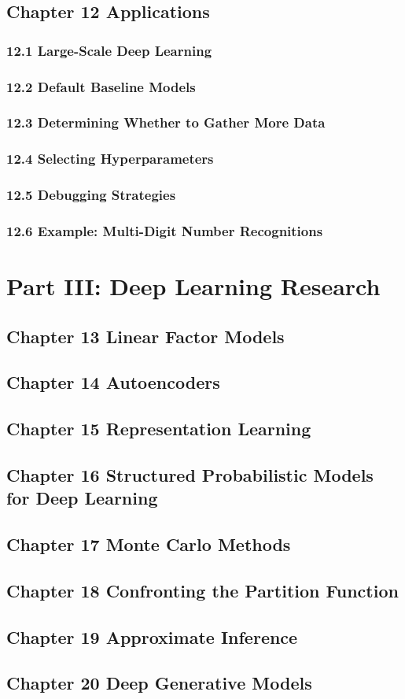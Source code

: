 \documentclass[a4paper]{report}
\begin{document}
\section{Chapter 12 Applications}
\subsection{12.1 Large-Scale Deep Learning}
\subsection{12.2 Default Baseline Models}
\subsection{12.3 Determining Whether to Gather More Data}
\subsection{12.4 Selecting Hyperparameters}
\subsection{12.5 Debugging Strategies}
\subsection{12.6 Example: Multi-Digit Number Recognitions}

\chapter{Part III: Deep Learning Research}
\section{Chapter 13 Linear Factor Models}
\section{Chapter 14 Autoencoders}
\section{Chapter 15 Representation Learning}
\section{Chapter 16 Structured Probabilistic Models for Deep Learning}
\section{Chapter 17 Monte Carlo Methods}
\section{Chapter 18 Confronting the Partition Function}
\section{Chapter 19 Approximate Inference}
\section{Chapter 20 Deep Generative Models}
\end{document}
